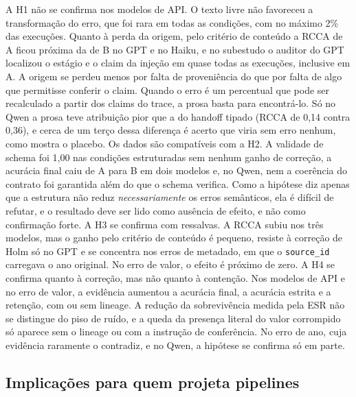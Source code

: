 A H1 não se confirma nos modelos de API.
O texto livre não favoreceu a transformação do erro, que foi rara em todas as condições, com no máximo 2\% das execuções.
Quanto à perda da origem, pelo critério de conteúdo a RCCA de A ficou próxima da de B no GPT e no Haiku, e no subestudo o auditor do GPT localizou o estágio e o claim da injeção em quase todas as execuções, inclusive em A.
A origem se perdeu menos por falta de proveniência do que por falta de algo que permitisse conferir o claim. Quando o erro é um percentual que pode ser recalculado a partir dos claims do trace, a prosa basta para encontrá-lo.
Só no Qwen a prosa teve atribuição pior que a do handoff tipado (RCCA de 0,14 contra 0,36), e cerca de um terço dessa diferença é acerto que viria sem erro nenhum, como mostra o placebo.
Os dados são compatíveis com a H2.
A validade de schema foi 1,00 nas condições estruturadas sem nenhum ganho de correção, a acurácia final caiu de A para B em dois modelos e, no Qwen, nem a coerência do contrato foi garantida além do que o schema verifica. Como a hipótese diz apenas que a estrutura não reduz \emph{necessariamente} os erros semânticos, ela é difícil de refutar, e o resultado deve ser lido como ausência de efeito, e não como confirmação forte.
A H3 se confirma com ressalvas.
A RCCA subiu nos três modelos, mas o ganho pelo critério de conteúdo é pequeno, resiste à correção de Holm só no GPT e se concentra nos erros de metadado, em que o \texttt{source\_id} carregava o ano original. No erro de valor, o efeito é próximo de zero.
A H4 se confirma quanto à correção, mas não quanto à contenção. Nos modelos de API e no erro de valor, a evidência aumentou a acurácia final, a acurácia estrita e a retenção, com ou sem lineage. A redução da sobrevivência medida pela ESR não se distingue do piso de ruído, e a queda da presença literal do valor corrompido só aparece sem o lineage ou com a instrução de conferência. No erro de ano, cuja evidência raramente o contradiz, e no Qwen, a hipótese se confirma só em parte.

\subsection{Implicações para quem projeta pipelines}\label{sec:disc-implicacoes}

